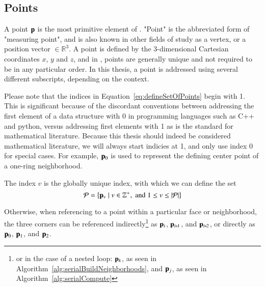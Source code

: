 \subsection{Points}
\label{chBsP}
A point $\mathbf{p}$ is the most primitive element of \tdd{}. "Point" is the abbreviated form of "measuring point", and is also known in other fields of study as a vertex, or a position vector $\in \mathbb{R}^3$. A point is defined by the 3-dimensional Cartesian coordinates $x$, $y$ and $z$, and in \tdd{}, points are generally unique and not required to be in any particular order. In this thesis, a point is addressed using several different subscripts, depending on the context.

Please note that the indices in Equation~\ref{eq:defineSetOfPoints} begin with 1. This is significant because of the discordant conventions between addressing the first element of a data structure with 0 in programming languages such as C++ and python, versus addressing first elements with 1 as is the standard for mathematical literature. Because this thesis should indeed be considered mathematical literature, we will always start indicies at 1, and only use index 0 for special cases. For example, $\mathbf{p}_0$ is used to represent the defining center point of a one-ring neighborhood.

The index $v$ is the globally unique index, with which we can define the set
\begin{equation}
	\mathcal{P} = \left \{\mathbf{p}_v \mid v \in \mathbb{Z}^+, \;\text{and}\; 1\leq v \leq|\mathcal{P}| \right \}
	\label{eq:defineSetOfPoints}
\end{equation}%
%
%
%

Otherwise,
 when referencing to a point within a particular face or neighborhood, the three corners can be referenced indirectly\footnote{or in the case of a nested loop: $\mathbf{p}_k$, as seen in Algorithm~\ref{alg:serialBuildNeighborhoods}, and $\mathbf{p}_j$, as seen in Algorithm~\ref{alg:serialCompute}} as $\mathbf{p}_i$, $\bp_{\sipo}$, and $\bp_{\sipt}$, or directly as $\mathbf{p}_0$, $\mathbf{p}_1$, and $\mathbf{p}_2$.%
%
%
~\cite[p.~25]{Mara12}%


